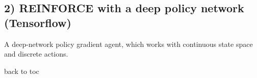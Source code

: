 \documentclass[11pt]{article}
\begin{document}
    \begin{center}
    \end{center}
    { \hspace*{\fill} \\}
    
    \begin{center}
    \end{center}
    { \hspace*{\fill} \\}
    
    \subsection{2) REINFORCE with a deep policy network
(Tensorflow)}\label{reinforce-with-a-deep-policy-network-tensorflow}

A deep-network policy gradient agent, which works with continuous state
space and discrete actions.

back to toc
\end{document}
